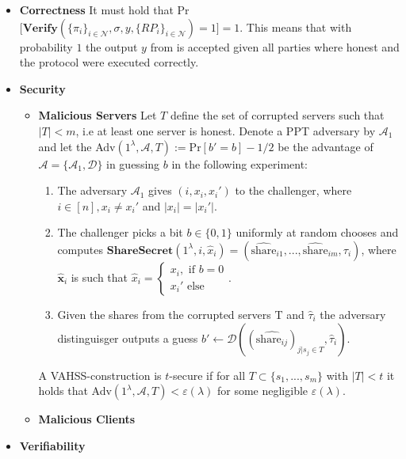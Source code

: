 \begin{itemize}
    \item \textbf{Correctness} It must hold that Pr$\Big[\textbf{Verify}(\{\pi_i\}_{i\in\mathcal{N}},\sigma,y,\{RP_i\}_{i\in\mathcal{N}})=1\Big]=1$. This means that 					with probability $1$ the output $y$ from  is accepted given all parties where honest and the protocol were executed correctly.
    \item \textbf{Security} 
    			\begin{itemize}
    						\item \textbf{Malicious Servers } Let $T$ define the set of corrupted servers such that $|T|<m$, i.e at 					least one server is honest.  										Denote a PPT adversary by $\mathcal{A}_1$ and let the Adv$(1^			\lambda,\mathcal{A},T):= \text{Pr}[b' = b]-1/2$ be the advantage 										of $\mathcal{A}=\{\mathcal{A}_1,\mathcal{D}\}$ in guessing $b$ in the following experiment:
    									\begin{enumerate}
       										 \item The adversary $\mathcal{A}_1$ gives $(i,x_i,x_i')$ to the challenger, where $i\in[n], x_i\neq x_i'$ and $|x_i|=|x_i'|$.
        										\item The challenger picks a bit $b\in\{0,1\}$ uniformly at random chooses and computes $\textbf{ShareSecret}(1^\lambda,i,																\hat{x}_i) = (\hat{\text{share}}_{i1},...,\hat{\text{share}}_{im},\tau_i)$, where $\hat{\textbf{x}}_i$ is  such that $\hat{x}_i = 																\begin{cases}x_i, \text{ if } b=0 \\ x_i' \text{ else} \end{cases}$. 
        										\item Given the shares from the corrupted servers T and $\hat{\tau}_i$ the adversary distinguisger outputs a guess 																			$b'\xleftarrow[]{}\mathcal{D}((\hat{\text{share}_{ij}})_{j|s_j\in T},\hat{\tau}_i)$.
   									 \end{enumerate}
    									A VAHSS-construction is $t$-secure if for all $T\subset \{s_1,...,s_m\}$ with $|T|<t$ it holds that Adv$(1^\lambda,\mathcal{A},T)<												\varepsilon(\lambda)$ for some negligible $\varepsilon(\lambda)$.
  					  \item \textbf{Malicious Clients}
   		 \end{itemize} 
 	\item \textbf{Verifiability} 
 			\begin{itemize}

\end{itemize}
\end{itemize}
